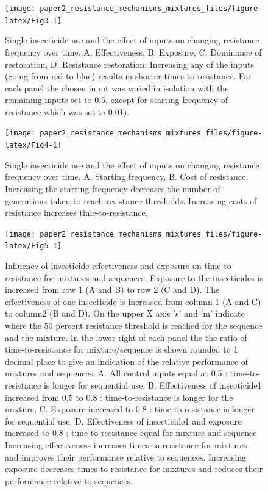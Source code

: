 \documentclass[11pt,]{article}
\begin{document}
\begin{figure}

\texttt{[image: paper2\_resistance\_mechanisms\_mixtures\_files/figure-latex/Fig3-1]} \hfill{}

\caption{Single insecticide use and the effect of inputs on changing resistance frequency over time. A. Effectiveness, B. Exposure, C. Dominance of restoration, D. Resistance restoration. Increasing any of the inputs (going from red to blue) results in shorter times-to-resistance. For each panel the chosen input was varied in isolation with the remaining inputs set to 0.5, except for starting frequency of resistance which was set to 0.01). }\label{fig:Fig3}
\end{figure}

\begin{figure}

\texttt{[image: paper2\_resistance\_mechanisms\_mixtures\_files/figure-latex/Fig4-1]} \hfill{}

\caption{Single insecticide use and the effect of inputs on changing resistance frequency over time. A. Starting frequency, B. Cost of resistance. Increasing the starting frequency decreases the number of generations taken to reach resistance thresholds. Increasing costs of resistance increases time-to-resistance.}\label{fig:Fig4}
\end{figure}

\begin{figure}

\texttt{[image: paper2\_resistance\_mechanisms\_mixtures\_files/figure-latex/Fig5-1]} \hfill{}

\caption{Influence of insecticide effectiveness and exposure on time-to-resistance for mixtures and sequences. Exposure to the insecticides is increased from row 1 (A and B) to row 2 (C and D). The effectiveness of one insecticide is increased from column 1 (A and C) to column2 (B and D). On the upper X axis 's' and 'm' indicate where the 50 percent resistance threshold is reached for the sequence and the mixture. In the lower right of each panel the the ratio of time-to-resistance for mixture/sequence is shown rounded to 1 decimal place to give an indication of the relative performance of mixtures and sequences.  A. All control inputs equal at 0.5 : time-to-resistance is longer for sequential use, B. Effectiveness of insecticide1 increased from 0.5 to 0.8 : time-to-resistance is longer for the mixture, C. Exposure increased to 0.8 : time-to-resistance is longer for sequential use, D. Effectiveness of insecticide1 and exposure increased to 0.8 : time-to-resistance equal for mixture and sequence. Increasing effectiveness increases times-to-resistance for mixtures and improves their performance relative to sequences. Increasing exposure decreases times-to-resistance for mixtures and reduces their performance relative to sequences. }\label{fig:Fig5}
\end{figure}
\end{document}
